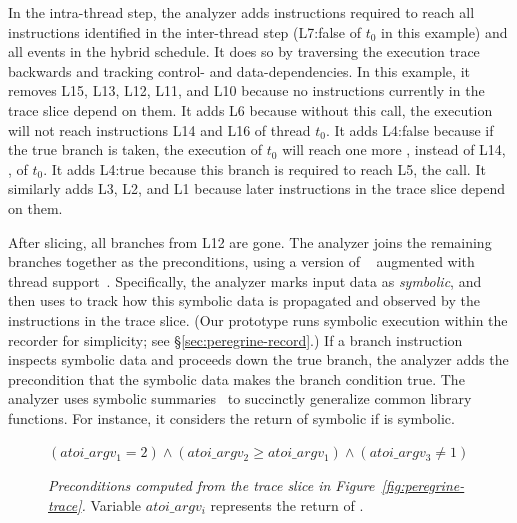 In the intra-thread step, the analyzer adds instructions required 
to reach all instructions identified in the
inter-thread step (L7:false of $t_0$ in this example) and all events in
the hybrid schedule.  It does so by traversing the execution trace
backwards and tracking control- and data-dependencies.  In this example, it
removes L15, L13, L12, L11, and L10 because no instructions currently in
the trace slice depend on them.  It adds L6 because without this call, the
execution will not reach instructions L14 and L16 of thread $t_0$.  It adds
L4:false because if the true branch is taken, the execution of $t_0$ will
reach one more , instead of L14,
, of $t_0$.  It adds L4:true because this branch
is required to reach L5, the  call.  It similarly
adds L3, L2, and L1 because later instructions in the trace slice
depend on them.


After slicing, all branches from L12 are gone.  The
analyzer joins the remaining branches together as the
preconditions, using a version of \klee~\cite{klee:osdi08} augmented with
thread support~\cite{cui:tern:osdi10}.  Specifically, the analyzer marks
input data as \emph{symbolic}, and then uses \klee to track how this symbolic
data is propagated and observed by the instructions in the trace slice.
(Our \peregrine prototype runs symbolic execution within the recorder for
simplicity; see \S\ref{sec:peregrine-record}.)
If a branch instruction inspects symbolic data and proceeds down the true
branch, the analyzer adds the precondition that the symbolic data makes
the branch condition true.  The analyzer uses symbolic
summaries~\cite{castro:bouncer} to succinctly generalize common library
functions.  For instance, it considers the return of 
symbolic if  is symbolic.

\begin{figure}[t]
\centering
\begin{minipage}[t]{3.1in}
\begin{scriptsize}
$(atoi\_argv_1 = 2) \wedge (atoi\_argv_2 \geq atoi\_argv_1) \wedge
  (atoi\_argv_3 \neq 1) $
\end{scriptsize}
\end{minipage}
\caption{{\em Preconditions computed from the trace slice in
    Figure~\ref{fig:peregrine-trace}.}  Variable $atoi\_argv_i$ represents the
  return of .} \label{fig:peregrine-precond}
\end{figure}

